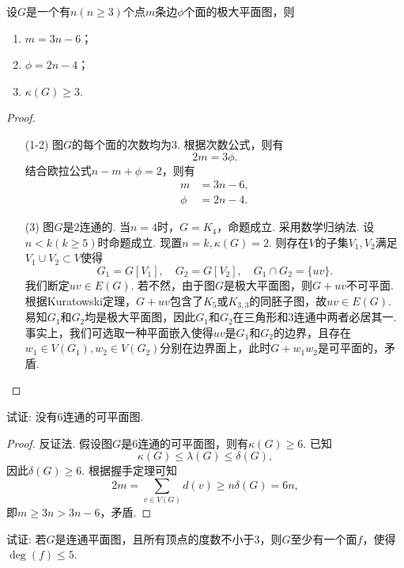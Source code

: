 \documentclass[cn,blue,normal,founder,11pt]{elegantnote}
\begin{document}
\begin{example}
	设\(G\)是一个有\(n(n\geqslant 3)\)个点\(m\)条边\(\phi\)个面的极大平面图，则
	\begin{enumerate}[(1)]
		\item \(m=3n-6\)；
		\item \(\phi=2n-4\)；
		\item \(\kappa(G)\geqslant 3\).
	\end{enumerate}
\end{example}

\begin{proof}
	\begin{enumerate}
		\item[(1-2)] 图\(G\)的每个面的次数均为\(3\). 根据次数公式，则有
		\[2m=3\phi.\] 
		结合欧拉公式\(n-m+\phi=2\)，则有
		\begin{align*}
			m&=3n-6,\\
			\phi&=2n-4.
		\end{align*}
		\item[(3)] 图\(G\)是\(2\)连通的. 当\(n=4\)时，\(G=K_4\)，命题成立. 采用数学归纳法. 设\(n<k(k\geqslant 5)\)时命题成立. 现置\(n=k,\kappa(G)=2\). 则存在\(V\)的子集\(V_1,V_2\)满足\(V_1\cup V_2\subset V\)使得
		\[G_1=G[V_1],\quad G_2=G[V_2],\quad G_1\cap G_2=\{uv\}.\]
		我们断定\(uv\in E(G)\). 若不然，由于图\(G\)是极大平面图，则\(G+uv\)不可平面. 根据Kuratowski定理，\(G+uv\)包含了\(K_5\)或\(K_{3,3}\)的同胚子图，故\(uv\in E(G)\). 易知\(G_1\)和\(G_2\)均是极大平面图，因此\(G_1\)和\(G_2\)在三角形和\(3\)连通中两者必居其一. 事实上，我们可选取一种平面嵌入使得\(uv\)是\(G_1\)和\(G_2\)的边界，且存在\(w_1\in V(G_1),w_2\in V(G_2)\)分别在边界面上，此时\(G+w_1w_2\)是可平面的，矛盾.
	\end{enumerate}
\end{proof}

\begin{example}
	试证: 没有\(6\)连通的可平面图.
\end{example}

\begin{proof}
	反证法. 假设图\(G\)是\(6\)连通的可平面图，则有\(\kappa(G)\geqslant 6\). 已知
	\[\kappa(G)\leqslant\lambda(G)\leqslant\delta(G),\]
	因此\(\delta(G)\geqslant 6\). 根据握手定理可知
	\[2m=\sum_{v\in V(G)}d(v)\geqslant n\delta(G)=6n,\]
	即\(m\geqslant 3n>3n-6\)，矛盾.
\end{proof}

\begin{example}
	试证: 若\(G\)是连通平面图，且所有顶点的度数不小于\(3\)，则\(G\)至少有一个面\(f\)，使得\(\deg(f)\leqslant 5\).
\end{example}
\end{document}
